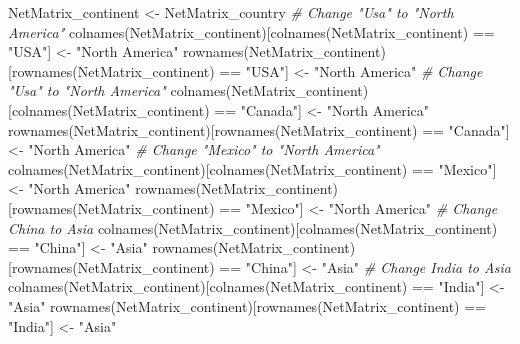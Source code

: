 \documentclass[
]{article}
\newenvironment{Shaded}{\begin{snugshade}}{\end{snugshade}}
\newcommand{\CommentTok}[1]{\textcolor[rgb]{0.56,0.35,0.01}{\textit{#1}}}
\newcommand{\FunctionTok}[1]{\textcolor[rgb]{0.00,0.00,0.00}{#1}}
\newcommand{\NormalTok}[1]{#1}
\newcommand{\OtherTok}[1]{\textcolor[rgb]{0.56,0.35,0.01}{#1}}
\newcommand{\SpecialCharTok}[1]{\textcolor[rgb]{0.00,0.00,0.00}{#1}}
\newcommand{\StringTok}[1]{\textcolor[rgb]{0.31,0.60,0.02}{#1}}
\begin{document}
\begin{Shaded}
\begin{Highlighting}[]
\NormalTok{NetMatrix\_continent }\OtherTok{\textless{}{-}}\NormalTok{ NetMatrix\_country}
\CommentTok{\# Change "Usa" to "North America"}
\FunctionTok{colnames}\NormalTok{(NetMatrix\_continent)[}\FunctionTok{colnames}\NormalTok{(NetMatrix\_continent) }\SpecialCharTok{==} \StringTok{"USA"}\NormalTok{] }\OtherTok{\textless{}{-}} \StringTok{"North America"}
\FunctionTok{rownames}\NormalTok{(NetMatrix\_continent)[}\FunctionTok{rownames}\NormalTok{(NetMatrix\_continent) }\SpecialCharTok{==} \StringTok{"USA"}\NormalTok{] }\OtherTok{\textless{}{-}} \StringTok{"North America"}
\CommentTok{\# Change "Usa" to "North America"}
\FunctionTok{colnames}\NormalTok{(NetMatrix\_continent)[}\FunctionTok{colnames}\NormalTok{(NetMatrix\_continent) }\SpecialCharTok{==} \StringTok{"Canada"}\NormalTok{] }\OtherTok{\textless{}{-}} \StringTok{"North America"}
\FunctionTok{rownames}\NormalTok{(NetMatrix\_continent)[}\FunctionTok{rownames}\NormalTok{(NetMatrix\_continent) }\SpecialCharTok{==} \StringTok{"Canada"}\NormalTok{] }\OtherTok{\textless{}{-}} \StringTok{"North America"}
\CommentTok{\# Change "Mexico" to "North America"}
\FunctionTok{colnames}\NormalTok{(NetMatrix\_continent)[}\FunctionTok{colnames}\NormalTok{(NetMatrix\_continent) }\SpecialCharTok{==} \StringTok{"Mexico"}\NormalTok{] }\OtherTok{\textless{}{-}} \StringTok{"North America"}
\FunctionTok{rownames}\NormalTok{(NetMatrix\_continent)[}\FunctionTok{rownames}\NormalTok{(NetMatrix\_continent) }\SpecialCharTok{==} \StringTok{"Mexico"}\NormalTok{] }\OtherTok{\textless{}{-}} \StringTok{"North America"}
\CommentTok{\# Change China to Asia}
\FunctionTok{colnames}\NormalTok{(NetMatrix\_continent)[}\FunctionTok{colnames}\NormalTok{(NetMatrix\_continent) }\SpecialCharTok{==} \StringTok{"China"}\NormalTok{] }\OtherTok{\textless{}{-}} \StringTok{"Asia"}
\FunctionTok{rownames}\NormalTok{(NetMatrix\_continent)[}\FunctionTok{rownames}\NormalTok{(NetMatrix\_continent) }\SpecialCharTok{==} \StringTok{"China"}\NormalTok{] }\OtherTok{\textless{}{-}} \StringTok{"Asia"}
\CommentTok{\# Change India to Asia}
\FunctionTok{colnames}\NormalTok{(NetMatrix\_continent)[}\FunctionTok{colnames}\NormalTok{(NetMatrix\_continent) }\SpecialCharTok{==} \StringTok{"India"}\NormalTok{] }\OtherTok{\textless{}{-}} \StringTok{"Asia"}
\FunctionTok{rownames}\NormalTok{(NetMatrix\_continent)[}\FunctionTok{rownames}\NormalTok{(NetMatrix\_continent) }\SpecialCharTok{==} \StringTok{"India"}\NormalTok{] }\OtherTok{\textless{}{-}} \StringTok{"Asia"}

\end{Highlighting}
\end{Shaded}
\end{document}
